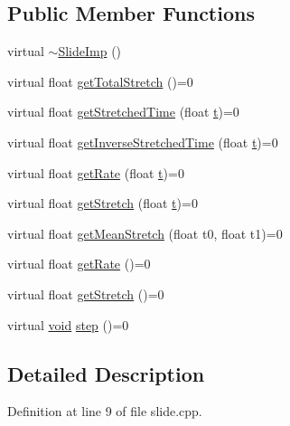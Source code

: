 \subsection*{Public Member Functions}
\begin{DoxyCompactItemize}
\item 
virtual \hyperlink{class__sbsms___1_1_slide_imp_a4d00de0e73c9a441fd184744baa006ab}{$\sim$\+Slide\+Imp} ()
\item 
virtual float \hyperlink{class__sbsms___1_1_slide_imp_abe9a9bb72fad6554dcc480dbb99fadb7}{get\+Total\+Stretch} ()=0
\item 
virtual float \hyperlink{class__sbsms___1_1_slide_imp_aac063330df094488c257b32da9afc7a1}{get\+Stretched\+Time} (float \hyperlink{octave__test_8m_aaccc9105df5383111407fd5b41255e23}{t})=0
\item 
virtual float \hyperlink{class__sbsms___1_1_slide_imp_a2cc4ca4c044444ec1081b3da4f0b3226}{get\+Inverse\+Stretched\+Time} (float \hyperlink{octave__test_8m_aaccc9105df5383111407fd5b41255e23}{t})=0
\item 
virtual float \hyperlink{class__sbsms___1_1_slide_imp_ad89814b064da0c98a9f63b72ceae83ed}{get\+Rate} (float \hyperlink{octave__test_8m_aaccc9105df5383111407fd5b41255e23}{t})=0
\item 
virtual float \hyperlink{class__sbsms___1_1_slide_imp_ab2e5304c62bf8500a4675a8da57172b6}{get\+Stretch} (float \hyperlink{octave__test_8m_aaccc9105df5383111407fd5b41255e23}{t})=0
\item 
virtual float \hyperlink{class__sbsms___1_1_slide_imp_ab2a04993dea0c267a3a862750b89cdfb}{get\+Mean\+Stretch} (float t0, float t1)=0
\item 
virtual float \hyperlink{class__sbsms___1_1_slide_imp_aedc2b5d8559af34f3a2dab1a3dbd5404}{get\+Rate} ()=0
\item 
virtual float \hyperlink{class__sbsms___1_1_slide_imp_a2efb673ea5cc5adf3e915722e0d7393e}{get\+Stretch} ()=0
\item 
virtual \hyperlink{sound_8c_ae35f5844602719cf66324f4de2a658b3}{void} \hyperlink{class__sbsms___1_1_slide_imp_a9fb8905fd5b0d7c191d1b05717fdd659}{step} ()=0
\end{DoxyCompactItemize}


\subsection{Detailed Description}


Definition at line 9 of file slide.\+cpp.



